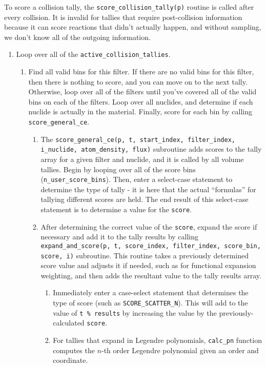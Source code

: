 \documentclass[10pt]{article}
\numberwithin{equation}{section} %
\begin{document}
To score a collision tally, the {\tt score\_collision\_tally(p)} routine is called after every collision. It is invalid for tallies that require post-collision information because it can score reactions that didn't actually happen, and without sampling, we don't know all of the outgoing information. 

\begin{enumerate}
\item Loop over all of the {\tt active\_collision\_tallies}. 
	\begin{enumerate}
	\item Find all valid bins for this filter. If there are no valid bins for this filter, then there is nothing to score, and you can move on to the next tally. Otherwise, loop over all of the filters until you've covered all of the valid bins on each of the filters. Loop over all nuclides, and determine if each nuclide is actually in the material. Finally, score for each bin by calling {\tt score\_general\_ce}.
		\begin{enumerate}
		\item The {\tt score\_general\_ce(p, t, start\_index, filter\_index, i\_nuclide, atom\_density, flux)} subroutine adds scores to the tally array for a given filter and nuclide, and it is called by all volume tallies. Begin by looping over all of the score bins ({\tt n\_user\_score\_bins}). Then, enter a select-case statement to determine the type of tally - it is here that the actual ``formulas'' for tallying different scores are held. The end result of this select-case statement is to determine a value for the {\tt score}. 
		\item After determining the correct value of the {\tt score}, expand the score if necessary and add it to the tally results by calling {\tt expand\_and\_score(p, t, score\_index, filter\_index, score\_bin, score, i)} subroutine. This routine takes a previously determined score value and adjusts it if needed, such as for functional expansion weighting, and then adds the resultant value to the tally results array. 
			\begin{enumerate}
			\item Immediately enter a case-select statement that determines the type of score (such as {\tt SCORE\_SCATTER\_N}). This will add to the value of {\tt t \% results} by increasing the value by the previously-calculated {\tt score}. 
			\item For tallies that expand in Legendre polynomials, {\tt calc\_pn} function computes the \(n\)-th order Legendre polynomial given an order and coordinate. 
			\end{enumerate}
		\end{enumerate}
	\end{enumerate}
\end{enumerate}
\end{document}
